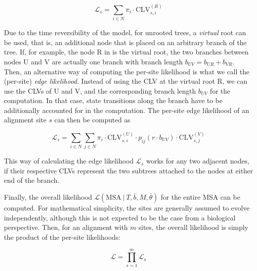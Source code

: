 \begin{equation}
    \label{ch:Foundations:sec:MLTreeInference:eq:root_site_likelihood}
    \mathcal{L}_{s} = \sum_{i \in N} \pi_i \cdot \mbox{CLV}^{(R)}_{s,i}
\end{equation}

Due to the time reversibility of the model, for unrooted trees, a \emph{virtual} root can be used,
that is, an additional node that is placed on an arbitrary branch of the tree.
If, for example, the node {\sffamily R} in  is the virtual root,
the two branches between nodes {\sffamily U} and {\sffamily V}
are actually one branch with branch length $b_{UV} = b_{UR} + b_{VR}$.
Then, an alternative way of computing the per-site likelihood is what we call the (per-site) \emph{edge likelihood}.
Instead of using the CLV at the virtual root {\sffamily R}, we can use the CLVs of {\sffamily U} and {\sffamily V},
and the corresponding branch length $b_{UV}$ for the computation.
In that case, state transitions along the branch have to be additionally accounted for in the computation.
The per-site edge likelihood of an alignment site $s$ can then be computed as

\begin{equation}
    \label{ch:Foundations:sec:MLTreeInference:eq:edge_likelihood}
    \mathcal{L}_{s} = \sum_{i \in N} \sum_{j \in N} \pi_i \cdot \mbox{CLV}^{(U)}_{s,i} \cdot
    p_{ij}(r \cdot b_{UV}) \cdot \mbox{CLV}^{(V)}_{s,j}
\end{equation}

This way of calculating the edge likelihood $\mathcal{L}_s$ works for any two adjacent nodes,
if their respective CLVs represent the two subtrees attached to the nodes at either end of the branch.

Finally, the overall likelihood $\mathcal{L}( \mbox{MSA} ~|~ T, \bar{b}, M, \bar{\theta} )$
for the entire MSA can be computed.
For mathematical simplicity, the sites are generally assumed to evolve independently,
although this is not expected to be the case from a biological perspective.
Then, for an alignment with $m$ sites, the overall likelihood is simply the product of the per-site likelihoods:

\begin{equation}
    \label{ch:Foundations:sec:MLTreeInference:eq:root_likelihood}
    \mathcal{L} = \prod_{s=1}^{m} \mathcal{L}_s
\end{equation}


